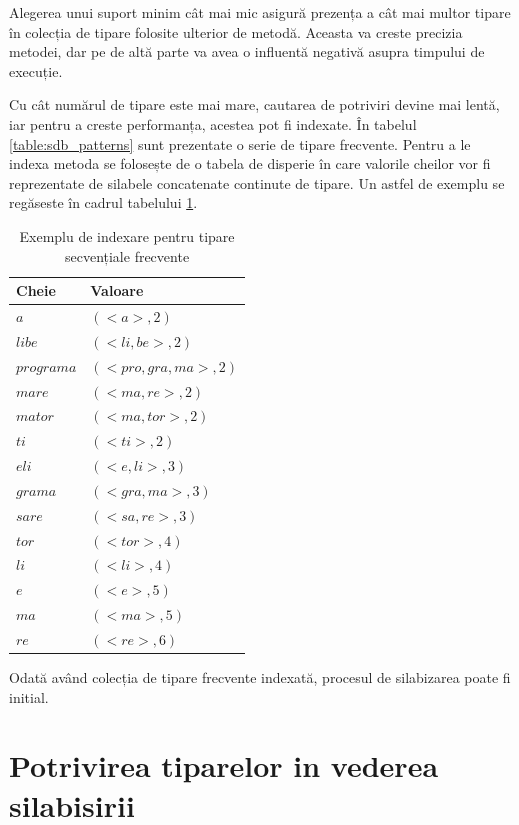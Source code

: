 Alegerea unui suport minim cât mai mic asigură prezența a cât mai multor tipare în colecția de tipare folosite ulterior de metodă. Aceasta va creste precizia metodei, dar pe de altă parte va avea o influentă negativă asupra timpului de execuție. 

Cu cât numărul de tipare este mai mare, cautarea de potriviri devine mai lentă, iar pentru a creste performanța, acestea pot fi indexate. În tabelul \ref{table:sdb_patterns} sunt prezentate o serie de tipare frecvente. Pentru a le indexa metoda se folosește de o tabela de disperie în care valorile cheilor vor fi reprezentate de silabele concatenate continute de tipare. Un astfel de exemplu se regăseste în cadrul tabelului \ref{table:sdb_index}. 

\begin{table}[h!]
\centering    
\begin{tabular}{|l|l|}    
\hline      
Cheie & Valoare\\
\hline
$a$ 		& $(<a>, 2)$  \\
$libe$ 		& $(<li, be>, 2)$  \\
$programa$ 	& $(<pro, gra, ma>, 2)$  \\
$mare$ 		& $(<ma, re>, 2)$  \\
$mator$ 	& $(<ma, tor>, 2)$  \\
$ti$ 		& $(<ti>, 2)$  \\
$eli$ 		& $(<e, li>, 3)$  \\
$grama$ 	& $(<gra, ma>, 3)$  \\
$sare$ 		& $(<sa, re>, 3)$  \\
$tor$ 		& $(<tor>, 4)$  \\
$li$ 		& $(<li>, 4)$  \\
$e$ 		& $(<e>, 5)$  \\
$ma$ 		& $(<ma>, 5)$  \\
$re$ 		& $(<re>, 6)$  \\
\hline
\end{tabular}
\caption{Exemplu de indexare pentru tipare secvențiale frecvente}
\label{table:sdb_index}               
\end{table}  

Odată având colecția de tipare frecvente indexată, procesul de silabizarea poate fi initial. 
 
\section{Potrivirea tiparelor in vederea silabisirii}

